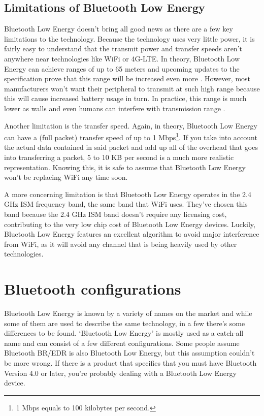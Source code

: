 \documentclass[pdftex,a4paper,12pt,twoside]{report}
\begin{document}
\subsection{Limitations of Bluetooth Low Energy}
\label{subsec:limitations}
Bluetooth Low Energy doesn't bring all good news as there are a few key limitations to the technology. Because the technology uses very little power, it is fairly easy to understand that the transmit power and transfer speeds aren't anywhere near technologies like WiFi or 4G-LTE. In theory, Bluetooth Low Energy can achieve ranges of up to 65 meters and upcoming updates to the specification prove that this range will be increased even more \citep{heydon2012bluetooth}. However, most manufacturers won't want their peripheral to transmit at such high range because this will cause increased battery usage in turn. In practice, this range is much lower as walls and even humans can interfere with transmission range \citep{faragher2014analysis}.

Another limitation is the transfer speed. Again, in theory, Bluetooth Low Energy can have a (full packet) transfer speed of up to 1 Mbps\footnote{1 Mbps equals to 100 kilobytes per second.}. If you take into account the actual data contained in said packet and add up all of the overhead that goes into transferring a packet, 5 to 10 KB per second is a much more realistic representation. Knowing this, it is safe to assume that Bluetooth Low Energy won't be replacing WiFi any time soon.

A more concerning limitation is that Bluetooth Low Energy operates in the 2.4 GHz ISM frequency band, the same band that WiFi uses. They've chosen this band because the 2.4 GHz ISM band doesn't require any licensing cost, contributing to the very low chip cost of Bluetooth Low Energy devices. Luckily, Bluetooth Low Energy features an excellent algorithm to avoid major interference from WiFi, as it will avoid any channel that is being heavily used by other technologies.

\section{Bluetooth configurations}
\label{sec:bleconfigurations}
Bluetooth Low Energy is known by a variety of names on the market and while some of them are used to describe the same technology, in a few there's some differences to be found. `Bluetooth Low Energy' is mostly used as a catch-all name and can consist of a few different configurations. Some people assume Bluetooth BR/EDR is also Bluetooth Low Energy, but this assumption couldn't be more wrong. If there is a product that specifies that you must have Bluetooth Version 4.0 or later, you're probably dealing with a Bluetooth Low Energy device.
\end{document}
